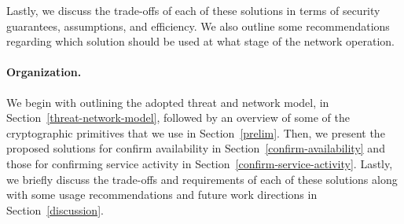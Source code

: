 Lastly, we discuss the trade-offs of each of these solutions in terms of security guarantees, assumptions, and efficiency. We also outline some recommendations regarding which solution should be used at what stage of the network operation. 


\paragraph{\bf Organization.}
We begin with outlining the adopted threat and network model, in Section~\ref{threat-network-model}, followed by an overview of some of the cryptographic primitives that we use in Section~\ref{prelim}. Then, we present the proposed solutions for confirm availability in Section~\ref{confirm-availability} and those for confirming service activity in Section~\ref{confirm-service-activity}. Lastly, we briefly discuss the trade-offs and requirements of each of these solutions along with some usage recommendations and future work directions in Section~\ref{discussion}.